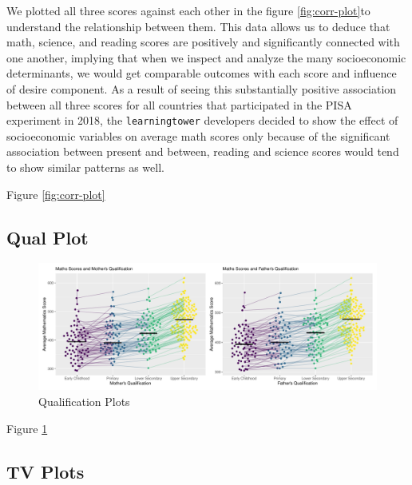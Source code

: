We plotted all three scores against each other in the figure
\ref{fig:corr-plot}to understand the relationship between them. This
data allows us to deduce that math, science, and reading scores are
positively and significantly connected with one another, implying that
when we inspect and analyze the many socioeconomic determinants, we
would get comparable outcomes with each score and influence of desire
component. As a result of seeing this substantially positive association
between all three scores for all countries that participated in the PISA
experiment in 2018, the \texttt{learningtower} developers decided to
show the effect of socioeconomic variables on average math scores only
because of the significant association between present and between,
reading and science scores would tend to show similar patterns as well.

Figure \ref{fig:corr-plot}

\hypertarget{qual-plot}{%
\subsection{Qual Plot}\label{qual-plot}}

\begin{Schunk}
\begin{figure}[H]
\includegraphics[width=1\linewidth]{learningtower_files/figure-latex/qual-plot-1} \caption[Qualification Plots]{Qualification Plots}\label{fig:qual-plot}
\end{figure}
\end{Schunk}

Figure \ref{fig:qual-plot}

\hypertarget{tv-plots}{%
\subsection{TV Plots}\label{tv-plots}}

